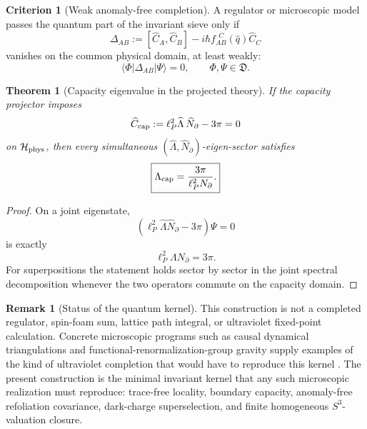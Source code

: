 \documentclass[aps,prd,reprint,nofootinbib,superscriptaddress,floatfix]{revtex4-2}
\numberwithin{equation}{section}
\theoremstyle{definition}
\newtheorem{criterion}{Criterion}[section]
\newtheorem{remark}{Remark}[section]
\theoremstyle{plain}
\newtheorem{theorem}{Theorem}[section]
\newcommand{\Hphys}{\mathcal H_{\rm phys}}
\begin{document}
\begin{criterion}[Weak anomaly-free completion]\label{crit:weak-anomaly}
A regulator or microscopic model passes the quantum part of the invariant sieve only if
\begin{equation}
\Delta_{AB}
:=
[\widehat C_A,\widehat C_B]
-i\hbar f_{AB}^{\ \ C}(\widehat q)\widehat C_C
\end{equation}
vanishes on the common physical domain, at least weakly:
\begin{equation}
\langle\Phi|\Delta_{AB}|\Psi\rangle=0,
\qquad
\Phi,\Psi\in\mathfrak D.
\end{equation}
\end{criterion}

\begin{theorem}[Capacity eigenvalue in the projected theory]\label{thm:capacity-eigenvalue-quantum}
If the capacity projector imposes
\begin{equation}
\widehat C_{\rm cap}:=\ell_P^2\widehat\Lambda\,\widehat N_\partial-3\pi=0
\end{equation}
on \(\Hphys\), then every simultaneous \((\widehat\Lambda,\widehat N_\partial)\)-eigen-sector satisfies
\begin{equation}
\boxed{
\Lambda_{\rm cap}=\frac{3\pi}{\ell_P^2N_\partial}.
}
\end{equation}
\end{theorem}

\begin{proof}
On a joint eigenstate,
\[
(\ell_P^2\widehat\Lambda\widehat N_\partial-3\pi)\Psi=0
\]
is exactly
\[
\ell_P^2\Lambda N_\partial=3\pi.
\]
For superpositions the statement holds sector by sector in the joint spectral decomposition whenever the two operators commute on the capacity domain.
\end{proof}

\begin{remark}[Status of the quantum kernel]
This construction is not a completed regulator, spin-foam sum, lattice path integral, or ultraviolet fixed-point calculation.  Concrete microscopic programs such as causal dynamical triangulations and functional-renormalization-group gravity supply examples of the kind of ultraviolet completion that would have to reproduce this kernel \cite{Loll2020,Saueressig2023}.  The present construction is the minimal invariant kernel that any such microscopic realization must reproduce: trace-free locality, boundary capacity, anomaly-free refoliation covariance, dark-charge superselection, and finite homogeneous \(S^3\)-valuation closure.
\end{remark}
\end{document}
